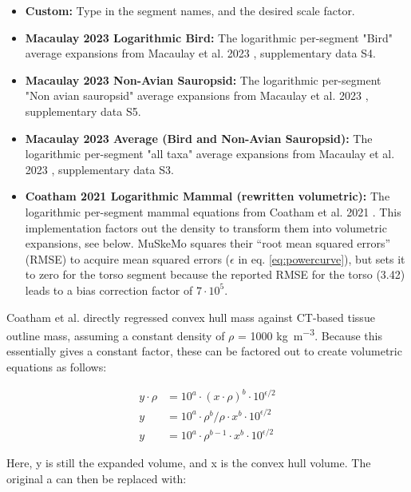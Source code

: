 \documentclass{article}
\begin{document}
\begin{itemize}
    \item \textbf{Custom:} Type in the segment names, and the desired scale factor.
    \item \textbf{Macaulay 2023 Logarithmic Bird:} The logarithmic per-segment "Bird" average expansions from Macaulay et al. 2023 \cite{macaulayDecouplingBodyShape2023}, supplementary data S4.
    \item \textbf{Macaulay 2023 Non-Avian Sauropsid:} The logarithmic per-segment "Non avian sauropsid" average expansions from Macaulay et al. 2023 \cite{macaulayDecouplingBodyShape2023}, supplementary data S5.
    \item \textbf{Macaulay 2023 Average (Bird and Non-Avian Sauropsid):} The logarithmic per-segment "all taxa" average expansions from Macaulay et al. 2023 \cite{macaulayDecouplingBodyShape2023}, supplementary data S3.
    \item \textbf{Coatham 2021 Logarithmic Mammal (rewritten volumetric):} The logarithmic per-segment mammal equations from Coatham et al. 2021 \cite{coathamConvexHullEstimation2021}. This implementation factors out the density to transform them into volumetric expansions, see below. MuSkeMo squares their ``root mean squared errors'' (RMSE) to acquire mean squared errors (\(\epsilon\) in eq. \ref{eq:powercurve}), but sets it to zero for the torso segment because the reported RMSE for the torso (3.42) leads to a bias correction factor of \(7 \cdot 10^{5}\).
\end{itemize}



Coatham et al. directly regressed convex hull mass against CT-based tissue outline mass, assuming a constant density of \(\rho\) = 1000 \si{kg m^{-3}}. Because this essentially gives a constant factor, these can be factored out to create volumetric equations as follows:

\begin{equation}
\begin{aligned}
y \cdot \rho &= 10^a \cdot (x \cdot \rho )^{b} \cdot 10^{\epsilon / 2} \\
y &= 10^a \cdot \rho^{b} / \rho  \cdot x^{b} \cdot 10^{\epsilon / 2} \\
y &= 10^a \cdot \rho^{b - 1} \cdot x^{b} \cdot 10^{\epsilon / 2}
\end{aligned}
\end{equation}


Here, y is still the expanded volume, and x is the convex hull volume. The original a can then be replaced with: 
\end{document}
